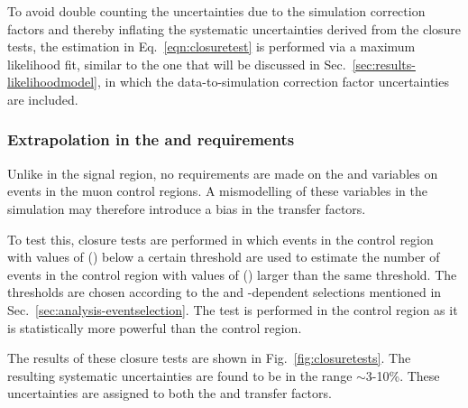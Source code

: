 To avoid double counting the uncertainties due to the simulation correction 
factors and thereby inflating the systematic uncertainties derived from the 
closure tests, the estimation in Eq.~\ref{eqn:closuretest} is performed via a 
maximum likelihood fit, similar to the one that will be discussed in 
Sec.~\ref{sec:results-likelihoodmodel}, in which the data-to-simulation 
correction factor uncertainties are included.

\subsubsection{Extrapolation in the \alphat and \bdphi requirements}
Unlike in the signal region, no requirements are made on the \alphat and \bdphi 
variables on events in the muon control regions. A mismodelling of these 
variables in the simulation may therefore introduce a bias in the transfer 
factors.

To test this, closure tests are performed in which events in the \mj control 
region with values of \alphat (\bdphi) below a certain threshold are used to 
estimate the number of events in the \mj control region with values of \alphat 
(\bdphi) larger than the same threshold. The thresholds are chosen according to 
the \bdphi and \scalht-dependent \alphat selections mentioned in 
Sec.~\ref{sec:analysis-eventselection}. The test is performed in the \mj 
control region as it is statistically more powerful than the \mmj control 
region.

The results of these closure tests are shown in Fig.~\ref{fig:closuretests}. 
The resulting systematic uncertainties are found to be in the range 
$\sim$3-10\%. These uncertainties are assigned to both the \Tmutottw and 
\Tmumutoz transfer factors. 

